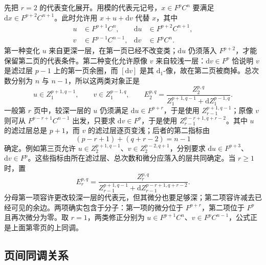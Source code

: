 \ProseParagraphBreak

先把 \(r=2\) 的代表变化展开。用模的代表元记号，\(x\in F^pC^n\) 要满足 \(\mathrm{d}x\in F^{p+2}C^{n+1}\)。此时允许用 \(x+u+\mathrm{d}v\) 代替 \(x\)，其中
\[
	\begin{aligned}
		u&\in F^{p+1}C^n,&\mathrm{d}u&\in F^{p+2}C^{n+1},\\
		v&\in F^{p-1}C^{n-1},&\mathrm{d}v&\in F^pC^n.
	\end{aligned}
\]
第一种变化 \(u\) 来自更深一层，在第一页已经不改变类；\(\mathrm{d}u\) 仍须落入 \(F^{p+2}\)，才能保留第二页的代表条件。第二种变化允许原像 \(v\) 来自较浅一层：\(\mathrm{d}v\in F^p\) 恰说明 \(v\) 是滤过层 \(p-1\) 上的第一页余圈，而 \([\mathrm{d}v]\) 是其 \(\mathrm{d}_1\)-像，故在第二页被商掉。总次数分别为 \(n\) 与 \(n-1\)，所以这两类对象正是
\[
	u\in Z_1^{p+1,q-1},\qquad v\in Z_1^{p-1,q},\qquad E_2^{p,q}=\frac{Z_2^{p,q}}{Z_1^{p+1,q-1}+\mathrm{d}Z_1^{p-1,q}}.
\]
一般第 \(r\) 页中，较深一层的 \(u\) 仍须满足 \(\mathrm{d}u\in F^{p+r}\)，于是使用 \(Z_{r-1}^{p+1,q-1}\)；原像 \(v\) 则可从 \(F^{p-r+1}C^{n-1}\) 出发，只要求 \(\mathrm{d}v\in F^p\)，于是使用 \(Z_{r-1}^{p-r+1,q+r-2}\)。其中 \(u\) 的滤过层总是 \(p+1\)，而 \(v\) 的滤过层逐页变浅；后者的第二指标由
\[
	(p-r+1)+(q+r-2)=n-1
\]
确定。例如第三页允许 \(u\in Z_2^{p+1,q-1}\)、\(v\in Z_2^{p-2,q+1}\)，分别要求 \(\mathrm d u\in F^{p+3}\)、\(\mathrm d v\in F^p\)。这些指标由所在滤过层、总次数和微分应落入的层共同确定。当 \(r\ge1\) 时，置
\begin{equation}\label{b4:eq:spectral-page-formula}
	E_r^{p,q}= \frac{Z_r^{p,q}} {Z_{r-1}^{p+1,q-1}+\mathrm{d}Z_{r-1}^{p-r+1,q+r-2}}.
\end{equation}
分母第一项容许更改较深一层的代表元，但其微分也要足够深；第二项容许减去已经可见的余边。两项确实包含于分子：第一项的微分位于 \(F^{p+r}\)，第二项位于 \(F^p\) 且再次微分为零。取 \(r=1\)，两类修正分别为 \(u\in F^{p+1}C^n\)、\(v\in F^pC^{n-1}\)，公式正是上面第零页的上同调。

\subsection{页间同调关系}
\label{b4:subsec:1402:02}

